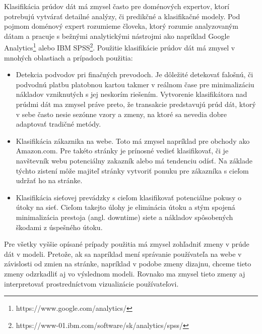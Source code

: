 \par
Klasifikácia prúdov dát má zmysel často pre doménových expertov, ktorí potrebujú vytvárať detailné analýzy, či predikčné a klasifikačné modely. Pod pojmom doménový expert rozumieme človeka, ktorý rozumie analyzovaným dátam a pracuje s bežnými analytickými nástrojmi ako napríklad Google Analytics\footnote{https://www.google.com/analytics/
} alebo IBM SPSS\footnote{https://www-01.ibm.com/software/sk/analytics/spss/}. Použitie klasifikácie prúdov dát má zmysel v mnohých oblastiach a prípadoch použitia:
\begin{itemize}
	\item Detekcia podvodov pri finačných prevodoch. Je dôležité detekovať falošnú, či podvodnú platbu platobnou kartou takmer v reálnom čase pre minimalizáciu nákladov vzniknutých s jej neskorím riešením. Vytvorenie klasifikátora nad prúdmi dát ma zmysel práve preto, že transakcie predstavujú prúd dát, ktorý v sebe často nesie sezónne vzory a zmeny, na ktoré sa nevedia dobre adaptovať tradičné metódy.
	\item Klasifikácia zákaznika na webe. Toto má zmysel napríklad pre obchody ako Amazon.com. Pre takéto stránky je prínosné vedieť klasifikovať, či je navštevník webu potenciálny zakazník alebo má tendenciu odísť. Na základe týchto zistení môže majiteľ stránky vytvoriť ponuku pre zákazníka s cieľom udržať ho na stránke.
	\item Klasifikácia sieťovej prevádzky s cieľom klasifikovať potenciálne pokusy o útoky na sieť. Cieľom takejto úlohy je eliminácia útoku a stým spojená minimalizácia prestoja (angl. downtime) siete a nákladov spôsobených škodami z úspešného útoku.
\end{itemize}
Pre všetky vyššie opísané prípady použitia má zmysel zohľadniť zmeny v prúde dát v modeli. Pretože, ak sa napríklad mení správanie používateľa na webe v závislosti od zmien na stránke, napríklad v podobe zmeny dizajnu, chceme tieto zmeny odzrkadliť aj vo výslednom modeli. Rovnako ma zmysel tieto zmeny aj interpretovať prostredníctvom vizualizácie používateľovi.

